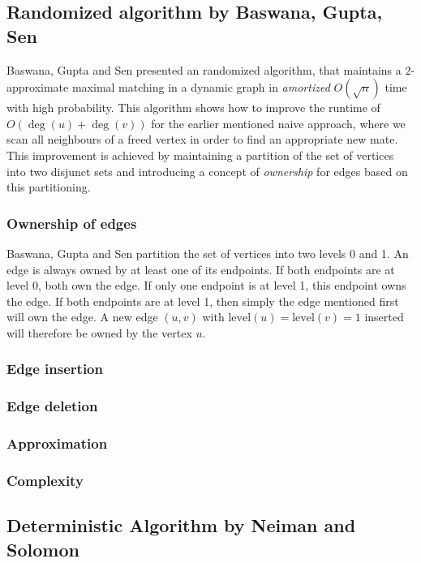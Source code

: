 \documentclass{article}      %
\begin{document}
\subsection{Randomized algorithm by Baswana, Gupta, Sen}
\label{sec:bgs}

Baswana, Gupta and Sen presented an randomized algorithm, that maintains a $2$-approximate maximal matching in a dynamic graph in \emph{amortized} $O(\sqrt{n})$ time with high probability. This algorithm shows how to improve the runtime of $O(\deg(u)+\deg(v))$ for the earlier mentioned naive approach, where we scan all neighbours of a freed vertex in order to find an appropriate new mate. This improvement is achieved by maintaining a partition of the set of vertices into two disjunct sets and introducing a concept of \emph{ownership} for edges based on this partitioning. 

\subsubsection{Ownership of edges}
\label{sec:own-edge}

Baswana, Gupta and Sen partition the set of vertices into two levels 0 and 1. An edge is always owned by at least one of its endpoints. If both endpoints are at level 0, both own the edge. If only one endpoint is at level 1, this endpoint owns the edge. If both endpoints are at level 1, then simply the edge mentioned first will own the edge. A new edge $(u,v)$ with $\mathrm{level}(u) = \mathrm{level}(v) = 1$ inserted will therefore be owned by the vertex $u$. 

\subsubsection{Edge insertion}

\subsubsection{Edge deletion}

\subsubsection{Approximation}

\subsubsection{Complexity}

\subsection{Deterministic Algorithm by Neiman and Solomon}
\label{sec:ns}
\end{document}
